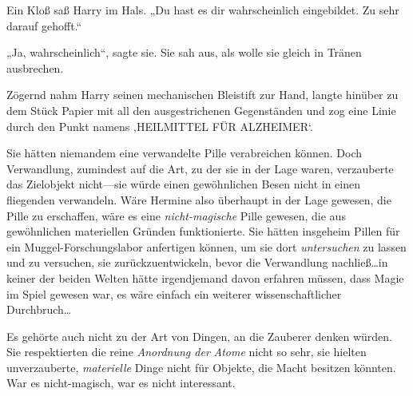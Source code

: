 Ein Kloß saß Harry im Hals. „Du hast es dir wahrscheinlich eingebildet. Zu sehr darauf gehofft.“

„Ja, wahrscheinlich“, sagte sie. Sie sah aus, als wolle sie gleich in Tränen ausbrechen.

Zögernd nahm Harry seinen mechanischen Bleistift zur Hand, langte hinüber zu dem Stück Papier mit all den ausgestrichenen Gegenständen und zog eine Linie durch den Punkt namens ‚HEILMITTEL FÜR ALZHEIMER‘.

Sie hätten niemandem eine verwandelte Pille verabreichen können. Doch Verwandlung, zumindest auf die Art, zu der sie in der Lage waren, verzauberte das Zielobjekt nicht—sie würde einen gewöhnlichen Besen nicht in einen fliegenden verwandeln. Wäre Hermine also überhaupt in der Lage gewesen, die Pille zu erschaffen, wäre es eine \emph{nicht-magische} Pille gewesen, die aus gewöhnlichen materiellen Gründen funktionierte. Sie hätten insgeheim Pillen für ein Muggel-Forschungslabor anfertigen können, um sie dort \emph{untersuchen} zu lassen und zu versuchen, sie zurückzuentwickeln, bevor die Verwandlung nachließ…in keiner der beiden Welten hätte irgendjemand davon erfahren müssen, dass Magie im Spiel gewesen war, es wäre einfach ein weiterer wissenschaftlicher Durchbruch…

Es gehörte auch nicht zu der Art von Dingen, an die Zauberer denken würden. Sie respektierten die reine \emph{Anordnung der} \emph{Atome} nicht so sehr, sie hielten unverzauberte, \emph{materielle} Dinge nicht für Objekte, die Macht besitzen könnten. War es nicht-magisch, war es nicht interessant.

